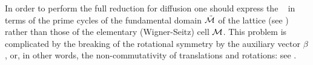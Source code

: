 {%
%
In order to perform the full reduction for diffusion one should
express the \dzeta\  in terms of the prime cycles of the
fundamental domain $\tilde {{\cal M}}$ of the lattice
(see ) rather than
those of the elementary (Wigner-Seitz) cell ${\cal M}$.  This problem
is complicated by
the breaking of the rotational symmetry by
the auxiliary vector $\beta$, or, in other words,
the non-commutativity of translations and rotations: see
.
\label{r:LorentzFundDomain}
}   %

